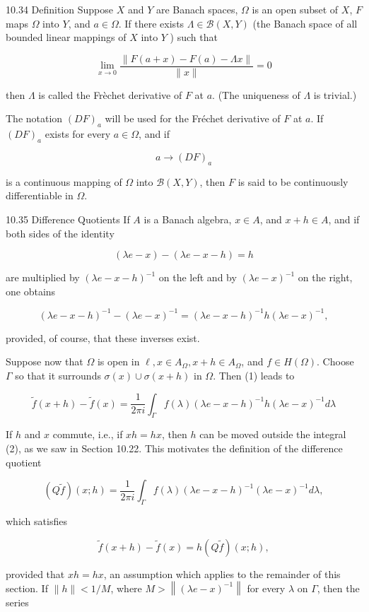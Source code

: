 \documentclass[10pt]{article}
\begin{document}
10.34 Definition Suppose $X$ and $Y$ are Banach spaces, $\Omega$ is an open subset of $X$, $F$ maps $\Omega$ into $Y$, and $a \in \Omega$. If there exists $\Lambda \in \mathscr{B}(X, Y)$ (the Banach space of all bounded linear mappings of $X$ into $Y$ ) such that

$$
\lim _{x \rightarrow 0} \frac{\|F(a+x)-F(a)-\Lambda x\|}{\|x\|}=0
$$

then $\Lambda$ is called the Frèchet derivative of $F$ at $a$. (The uniqueness of $\Lambda$ is trivial.)

The notation $(D F)_{a}$ will be used for the Fréchet derivative of $F$ at $a$. If $(D F)_{a}$ exists for every $a \in \Omega$, and if

$$
a \rightarrow(D F)_{a}
$$

is a continuous mapping of $\Omega$ into $\mathscr{B}(X, Y)$, then $F$ is said to be continuously differentiable in $\Omega$.

10.35 Difference Quotients If $A$ is a Banach algebra, $x \in A$, and $x+h \in A$, and if both sides of the identity

$$
(\lambda e-x)-(\lambda e-x-h)=h
$$

are multiplied by $(\lambda e-x-h)^{-1}$ on the left and by $(\lambda e-x)^{-1}$ on the right, one obtains

$$
(\lambda e-x-h)^{-1}-(\lambda e-x)^{-1}=(\lambda e-x-h)^{-1} h(\lambda e-x)^{-1},
$$

provided, of course, that these inverses exist.

Suppose now that $\Omega$ is open in $\ell, x \in A_{\Omega}, x+h \in A_{\Omega}$, and $f \in H(\Omega)$. Choose $\Gamma$ so that it surrounds $\sigma(x) \cup \sigma(x+h)$ in $\Omega$. Then (1) leads to

$$
\tilde{f}(x+h)-\tilde{f}(x)=\frac{1}{2 \pi i} \int_{\Gamma} f(\lambda)(\lambda e-x-h)^{-1} h(\lambda e-x)^{-1} d \lambda
$$

If $h$ and $x$ commute, i.e., if $x h=h x$, then $h$ can be moved outside the integral (2), as we saw in Section 10.22. This motivates the definition of the difference quotient

$$
(Q \tilde{f})(x ; h)=\frac{1}{2 \pi i} \int_{\Gamma} f(\lambda)(\lambda e-x-h)^{-1}(\lambda e-x)^{-1} d \lambda,
$$

which satisfies

$$
\tilde{f}(x+h)-\tilde{f}(x)=h(Q \tilde{f})(x ; h),
$$

provided that $x h=h x$, an assumption which applies to the remainder of this section. If $\|h\|<1 / M$, where $M>\left\|(\lambda e-x)^{-1}\right\|$ for every $\lambda$ on $\Gamma$, then the series
\end{document}
